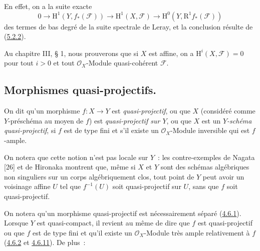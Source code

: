 
En effet, on a la suite exacte
\[
  0\to\mathrm{H}^1(Y,f_*(\mathcal{F}))\to
  \mathrm{H}^1(X,\mathcal{F})\to
  \mathrm{H}^0(Y,\mathrm{R}^1f_*(\mathcal{F}))
\]
des termes de bas degré de la suite spectrale de Leray, et la conclusion
résulte de (\hyperref[II.5.2.2-fr]{5.2.2}).

\begin{remark}[5.2.4]
\label{II.5.2.4-fr}
Au chapitre III, § 1, nous prouverons que si $X$ est affine, on a
$\mathrm{H}^i(X,\mathcal{F})=0$ pour tout $i>0$ et tout
$\mathcal{O}_X$-Module quasi-cohérent $\mathcal{F}$.
\end{remark}

\subsection{Morphismes quasi-projectifs.}
\label{subsection:II.5.3-fr}

\begin{definition}[5.3.1]
\label{II.5.3.1-fr}
On dit qu'un morphisme $f:X\to Y$ est \emph{quasi-projectif}, ou que $X$
(considéré comme $Y$-préschéma au moyen de $f$) est \emph{quasi-projectif
sur $Y$}, ou que $X$ est un \emph{$Y$-schéma quasi-projectif}, si $f$ est de
type fini et s'il existe un $\mathcal{O}_X$-Module inversible qui est
$f$-ample.
\end{definition}

On notera que cette notion n'est pas locale sur $Y$~: les contre-exemples de
Nagata [26] et de Hironaka montrent que, même si $X$ et $Y$ sont des schémas
algébriques non singuliers sur un corps algébriquement clos, tout point de
$Y$ peut avoir un voisinage affine $U$ tel que $f^{-1}(U)$ soit
quasi-projectif sur $U$, sans que $f$ soit quasi-projectif.

On notera qu'un morphisme quasi-projectif est nécessairement séparé
(\hyperref[II.4.6.1-fr]{4.6.1}). Lorsque $Y$ est quasi-compact, il revient au
même de dire que $f$ est quasi-projectif ou que $f$ est de type fini et qu'il
existe un $\mathcal{O}_X$-Module très ample relativement à $f$
(\hyperref[II.4.6.2-fr]{4.6.2} et \hyperref[II.4.6.11-fr]{4.6.11}). De plus~:

